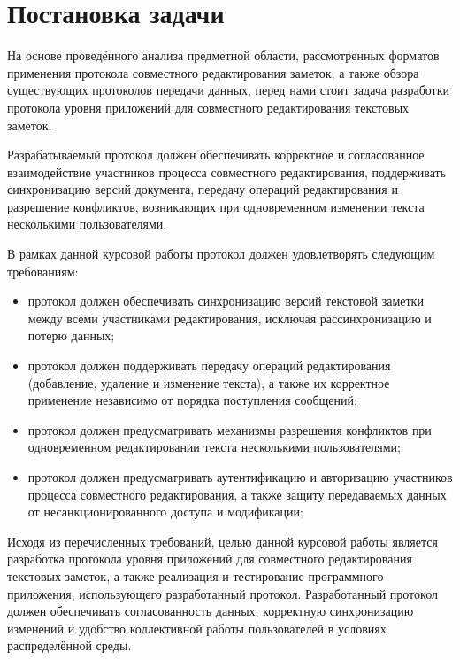 \section{Постановка задачи}

На основе проведённого анализа предметной области, рассмотренных форматов применения протокола совместного редактирования заметок, а также обзора существующих протоколов передачи данных, перед нами стоит задача разработки протокола уровня приложений для совместного редактирования текстовых заметок.

Разрабатываемый протокол должен обеспечивать корректное и согласованное взаимодействие участников процесса совместного редактирования, поддерживать синхронизацию версий документа, передачу операций редактирования и разрешение конфликтов, возникающих при одновременном изменении текста несколькими пользователями.

В рамках данной курсовой работы протокол должен удовлетворять следующим требованиям:

\begin{itemize}
    \item протокол должен обеспечивать синхронизацию версий текстовой заметки между всеми участниками редактирования, исключая рассинхронизацию и потерю данных;
    \item протокол должен поддерживать передачу операций редактирования (добавление, удаление и изменение текста), а также их корректное применение независимо от порядка поступления сообщений;
    \item протокол должен предусматривать механизмы разрешения конфликтов при одновременном редактировании текста несколькими пользователями;
    \item протокол должен предусматривать аутентификацию и авторизацию участников процесса совместного редактирования, а также защиту передаваемых данных от несанкционированного доступа и модификации;
\end{itemize}

Исходя из перечисленных требований, целью данной курсовой работы является разработка протокола уровня приложений для совместного редактирования текстовых заметок, а также реализация и тестирование программного приложения, использующего разработанный протокол. Разработанный протокол должен обеспечивать согласованность данных, корректную синхронизацию изменений и удобство коллективной работы пользователей в условиях распределённой среды.
